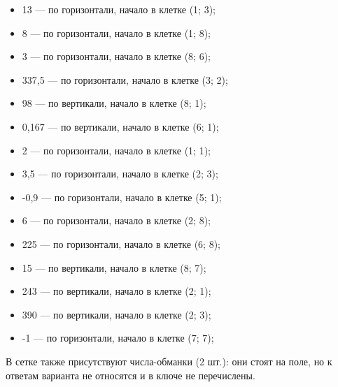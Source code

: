 \documentclass[a4paper,12pt]{article}
\begin{document}
\begin{itemize}
\item 13 --- по горизонтали, начало в клетке (1; 3);
\item 8 --- по горизонтали, начало в клетке (1; 8);
\item 3 --- по горизонтали, начало в клетке (8; 6);
\item 337,5 --- по горизонтали, начало в клетке (3; 2);
\item 98 --- по вертикали, начало в клетке (8; 1);
\item 0,167 --- по вертикали, начало в клетке (6; 1);
\item 2 --- по горизонтали, начало в клетке (1; 1);
\item 3,5 --- по горизонтали, начало в клетке (2; 3);
\item -0,9 --- по горизонтали, начало в клетке (5; 1);
\item 6 --- по горизонтали, начало в клетке (2; 8);
\item 225 --- по горизонтали, начало в клетке (6; 8);
\item 15 --- по вертикали, начало в клетке (8; 7);
\item 243 --- по вертикали, начало в клетке (2; 1);
\item 390 --- по вертикали, начало в клетке (2; 3);
\item -1 --- по горизонтали, начало в клетке (7; 7);
\end{itemize}

В сетке также присутствуют числа-обманки (2 шт.): они стоят на поле, но к ответам варианта не относятся и в ключе не перечислены.
\end{document}
